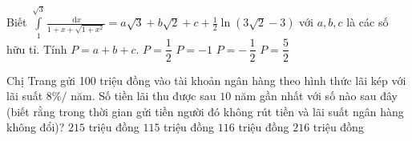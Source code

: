 \begin{ex}%
Biết $\displaystyle \int\limits_{1}^{\sqrt{3}} \frac{\mathrm{\,d}x}{1+x+\sqrt{1+x^2}}=a\sqrt{3}+b\sqrt{2}+c+\frac{1}{2}\ln(3\sqrt{2}-3)$ với $a, b, c$ là các số hữu tỉ. Tính $P=a+b+c$. 
\choice 
{$P=\dfrac{1}{2}$}
{$P=-1$}
{\True $P=-\,\dfrac{1}{2}$}
{$P=\dfrac{5}{2}$}  
\end{ex} 

\begin{ex}%
Chị Trang gửi 100 triệu đồng vào tài khoản ngân hàng theo hình thức lãi kép với lãi suất $8 \%/$ năm. Số tiền lãi thu được sau $10$ năm gần nhất với số nào sau đây (biết rằng trong thời gian gửi tiền người đó không rút tiền và lãi suất ngân hàng không đổi)? 
\choice 
{$215$ triệu đồng}
{$115$ triệu đồng}
{\True $116$ triệu đồng}
{$216$ triệu đồng}
\end{ex} 

